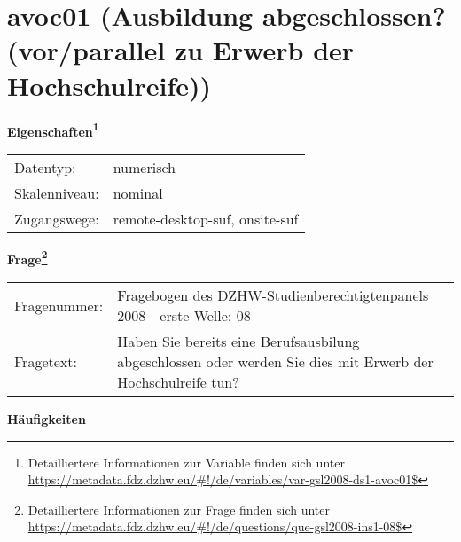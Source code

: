 
    \setcounter{footnote}{0}

    \vspace*{-1.8cm}
	\section{avoc01 (Ausbildung abgeschlossen? (vor/parallel zu Erwerb der Hochschulreife))}
	\label{section:avoc01}



    \vspace*{0.5cm}
    \noindent\textbf{Eigenschaften\footnote{Detailliertere Informationen zur Variable finden sich unter
		\url{https://metadata.fdz.dzhw.eu/\#!/de/variables/var-gsl2008-ds1-avoc01$}}}\\
	\begin{tabularx}{\hsize}{@{}lX}
	Datentyp: & numerisch \\
	Skalenniveau: & nominal \\
	Zugangswege: &
	  remote-desktop-suf, 
	  onsite-suf
 \\
    \end{tabularx}



				\vspace*{0.5cm}
                \noindent\textbf{Frage\footnote{Detailliertere Informationen zur Frage finden sich unter
		              \url{https://metadata.fdz.dzhw.eu/\#!/de/questions/que-gsl2008-ins1-08$}}}\\
				\begin{tabularx}{\hsize}{@{}lX}
					Fragenummer: &
					  Fragebogen des DZHW-Studienberechtigtenpanels 2008 - erste Welle:
					  08
 \\
					Fragetext: & Haben Sie bereits eine Berufsausbilung abgeschlossen oder werden Sie dies mit Erwerb der Hochschulreife tun? \\
				\end{tabularx}





        		\vspace*{0.5cm}
                \noindent\textbf{Häufigkeiten}

